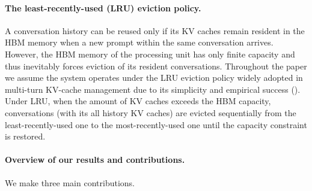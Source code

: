 \documentclass{article}
\theoremstyle{definition}
\begin{document}
\paragraph{The least-recently-used (LRU) eviction policy.}
A conversation history can be reused only if its KV caches remain resident in the HBM memory when a new prompt within the same conversation arrives. However, the HBM memory of the processing unit has only finite capacity and thus inevitably forces eviction of its resident conversations. Throughout the paper we assume the system operates under the LRU eviction policy widely adopted in multi-turn KV-cache management due to its simplicity and empirical success (\cite{wang2025kvcache, zhang2026tail}). Under LRU, when the amount of KV caches exceeds the HBM capacity, conversations (with its all history KV caches) are evicted sequentially from the least-recently-used one to the most-recently-used one until the capacity constraint is restored.

\vspace{-0.5em}

\paragraph{Overview of our results and contributions.}
We make three main contributions.
\vspace{-0.5em}
\end{document}
